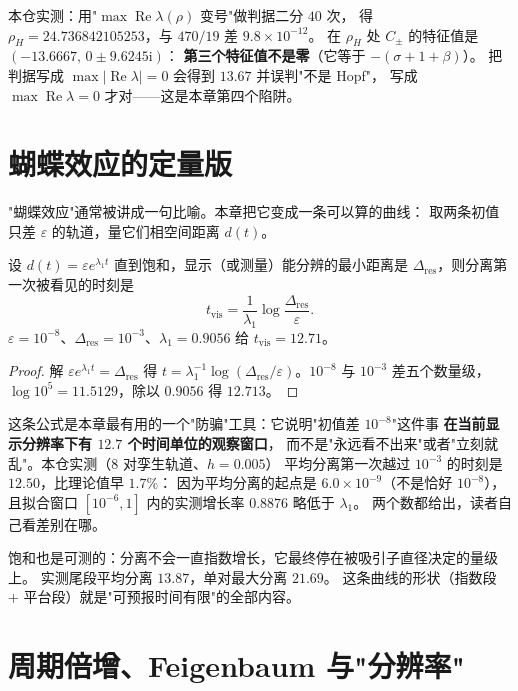 本仓实测：用"$\max\operatorname{Re}\lambda(\rho)$ 变号"做判据二分 $40$ 次，
得 $\rho_H=24.736842105253$，与 $470/19$ 差 $9.8\times10^{-12}$。
在 $\rho_H$ 处 $C_\pm$ 的特征值是 $(-13.6667,\,0\pm9.6245\mathrm{i})$：
\textbf{第三个特征值不是零}（它等于 $-\left(\sigma+1+\beta\right)$）。
把判据写成 $\max|\operatorname{Re}\lambda|=0$ 会得到 $13.67$ 并误判"不是 Hopf"，
写成 $\max\operatorname{Re}\lambda=0$ 才对——这是本章第四个陷阱。

\section{蝴蝶效应的定量版}

"蝴蝶效应"通常被讲成一句比喻。本章把它变成一条可以算的曲线：
取两条初值只差 $\varepsilon$ 的轨道，量它们相空间距离 $d(t)$。

\begin{theorem}[可分辨时间]
\label{thm:resolvable}
设 $d(t)=\varepsilon e^{\lambda_1t}$ 直到饱和，显示（或测量）能分辨的最小距离是
$\Delta_{\text{res}}$，则分离第一次被看见的时刻是
\begin{equation}
  t_{\text{vis}}=\frac{1}{\lambda_1}\log\frac{\Delta_{\text{res}}}{\varepsilon}.
  \label{eq:tvis}
\end{equation}
$\varepsilon=10^{-8}$、$\Delta_{\text{res}}=10^{-3}$、$\lambda_1=0.9056$ 给
$t_{\text{vis}}=12.71$。
\end{theorem}

\begin{proof}
解 $\varepsilon e^{\lambda_1t}=\Delta_{\text{res}}$ 得 $t=\lambda_1^{-1}
\log(\Delta_{\text{res}}/\varepsilon)$。$10^{-8}$ 与 $10^{-3}$ 差五个数量级，
$\log10^5=11.5129$，除以 $0.9056$ 得 $12.713$。
\end{proof}

这条公式是本章最有用的一个"防骗"工具：它说明"初值差 $10^{-8}$"这件事
\textbf{在当前显示分辨率下有 $12.7$ 个时间单位的观察窗口}，
而不是"永远看不出来"或者"立刻就乱"。本仓实测（8 对孪生轨道、$h=0.005$）
平均分离第一次越过 $10^{-3}$ 的时刻是 $12.50$，比理论值早 $1.7\%$：
因为平均分离的起点是 $6.0\times10^{-9}$（不是恰好 $10^{-8}$），
且拟合窗口 $[10^{-6},1]$ 内的实测增长率 $0.8876$ 略低于 $\lambda_1$。
两个数都给出，读者自己看差别在哪。

饱和也是可测的：分离不会一直指数增长，它最终停在被吸引子直径决定的量级上。
实测尾段平均分离 $13.87$，单对最大分离 $21.69$。
这条曲线的形状（指数段 + 平台段）就是"可预报时间有限"的全部内容。

\section{周期倍增、Feigenbaum 与"分辨率"}

